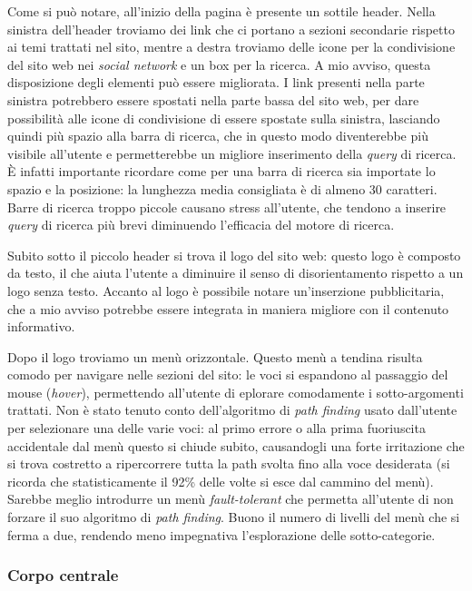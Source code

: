 Come si pu\`o notare, all'inizio della pagina \`e presente un sottile header.
Nella sinistra dell'header troviamo dei link che ci portano a sezioni secondarie
rispetto ai temi trattati nel sito, mentre a destra troviamo delle icone per la
condivisione del sito web nei \textit{social network} e un box per la ricerca.
A mio avviso, questa disposizione degli elementi pu\`o essere migliorata. I link
presenti nella parte sinistra potrebbero essere spostati nella parte bassa del
sito web, per dare possibilit\`a alle icone di condivisione di essere spostate
sulla sinistra, lasciando quindi pi\`u spazio alla barra di ricerca, che in
questo modo diventerebbe pi\`u visibile all'utente e permetterebbe un migliore
inserimento della \textit{query} di ricerca. \`E infatti importante ricordare
come per una barra di ricerca sia importate lo spazio e la posizione: la
lunghezza media consigliata \`e di almeno 30 caratteri. Barre di ricerca troppo
piccole causano stress all'utente, che tendono a inserire \textit{query} di
ricerca pi\`u brevi diminuendo l'efficacia del motore di ricerca.


Subito sotto il piccolo header si trova il logo del sito web: questo logo
\`e composto da testo, il che aiuta l'utente a diminuire il senso di
disorientamento rispetto a un logo senza testo.
Accanto al logo \`e possibile notare un'inserzione pubblicitaria, che a mio
avviso potrebbe essere integrata in maniera migliore con il contenuto
informativo.


Dopo il logo troviamo un men\`u orizzontale. Questo men\`u a tendina risulta
comodo per navigare nelle sezioni del sito: le voci si espandono al passaggio
del mouse (\textit{hover}), permettendo all'utente di eplorare comodamente i
sotto-argomenti trattati. Non \`e stato tenuto conto dell'algoritmo di
\textit{path finding} usato dall'utente per selezionare una delle varie voci: al
primo errore o alla prima fuoriuscita accidentale dal men\`u questo si chiude
subito, causandogli una forte irritazione che si trova
costretto a ripercorrere tutta la path svolta fino alla voce desiderata (si
ricorda che statisticamente il 92\% delle volte si esce dal cammino del men\`u).
Sarebbe meglio introdurre un men\`u \textit{fault-tolerant} che permetta
all'utente di non forzare il suo algoritmo di \textit{path finding}. Buono il
numero di livelli del men\`u che si ferma a due, rendendo meno impegnativa
l'esplorazione delle sotto-categorie.

\subsubsection{Corpo centrale}

